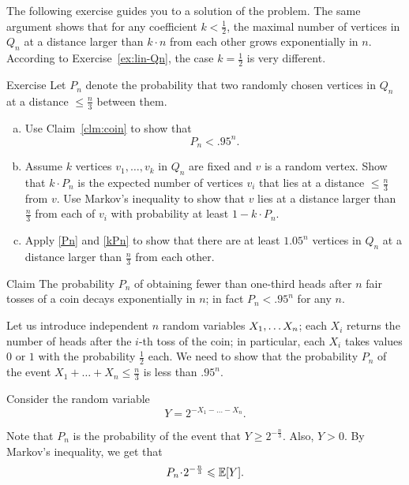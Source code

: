 The following exercise guides you to a solution of the problem.
The same argument shows that for any coefficient $k<\tfrac12$, the maximal number of vertices in $Q_n$ at a distance larger than $k\cdot n$ from each other grows exponentially in $n$.
According to Exercise~\ref{ex:lin-Qn}, the case $k= \tfrac12$ is very different.

\begin{thm}{Exercise}\label{ex:Qn-dist}
Let $P_n$ denote the probability that two randomly chosen vertices in $Q_n$ at a distance $\le\tfrac n3$ between them.
\begin{enumerate}[(a)]

\item\label{Pn} Use Claim~\ref{clm:coin} to show that 
\[P_n<.95^n.\]

\item\label{kPn} Assume $k$ vertices  $v_1,\dots ,v_k$ in $Q_n$ are fixed and $v$ is a random vertex.
Show that $k\cdot P_n$ is the expected number of vertices $v_i$ that lies at a distance $\le\tfrac n3$ from $v$.
Use Markov's inequality to show that $v$ lies at a distance larger than $\tfrac n3$ from each of $v_i$ with probability at least $1-k\cdot P_n$.

\item\label{ex:Qn-dist:end} Apply \ref{Pn} and \ref{kPn} to show that there are at least $1.05^n$ vertices in $Q_n$ at a distance larger than $\tfrac n3$ from each other.
\end{enumerate}
\end{thm}


\begin{thm}{Claim}\label{clm:coin}
The probability $P_n$ of obtaining fewer than one-third heads after $n$ fair tosses of a coin decays exponentially in $n$;
in fact $P_n<.95^n$ for any $n$.
\end{thm}

Let us introduce independent $n$ random variables $X_1,\dots X_n$;
each $X_i$ returns the number of heads after the $i$-th toss of the coin;
in particular, each $X_i$ takes values $0$ or $1$ with the probability $\tfrac12$ each.
We need to show that the probability $P_n$ of the event $X_1+\dots+X_n\le\tfrac n3$ is less than 
$.95^n$.

Consider the random variable 
\[Y=2^{-X_1-\dots-X_n}.\]

Note that $P_n$ is the probability of the event that $Y\ge 2^{-\frac n3}$.
Also, $Y>0$. 
By Markov's inequality, we get that
\[P_n\cdot 2^{-\frac n3}\le \EE[Y].\]

